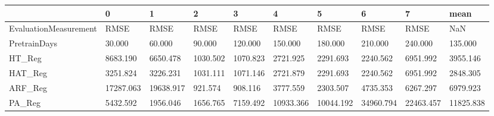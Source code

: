\begin{tabular}{llllllllll}
\toprule
{} &         0 &         1 &        2 &        3 &         4 &         5 &         6 &         7 &      mean \\
\midrule
EvaluationMeasurement &      RMSE &      RMSE &     RMSE &     RMSE &      RMSE &      RMSE &      RMSE &      RMSE &       NaN \\
PretrainDays          &    30.000 &    60.000 &   90.000 &  120.000 &   150.000 &   180.000 &   210.000 &   240.000 &   135.000 \\
HT\_Reg                &  8683.190 &  6650.478 & 1030.502 & 1070.823 &  2721.925 &  2291.693 &  2240.562 &  6951.992 &  3955.146 \\
HAT\_Reg               &  3251.824 &  3226.231 & 1031.111 & 1071.146 &  2721.879 &  2291.693 &  2240.562 &  6951.992 &  2848.305 \\
ARF\_Reg               & 17287.063 & 19638.917 &  921.574 &  908.116 &  3777.559 &  2303.507 &  4735.353 &  6267.297 &  6979.923 \\
PA\_Reg                &  5432.592 &  1956.046 & 1656.765 & 7159.492 & 10933.366 & 10044.192 & 34960.794 & 22463.457 & 11825.838 \\
\bottomrule
\end{tabular}
